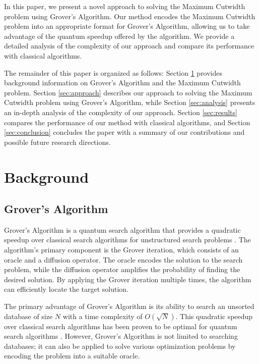 In this paper, we present a novel approach to solving the Maximum Cutwidth problem using Grover's Algorithm. Our method encodes the Maximum Cutwidth problem into an appropriate format for Grover's Algorithm, allowing us to take advantage of the quantum speedup offered by the algorithm. We provide a detailed analysis of the complexity of our approach and compare its performance with classical algorithms.

The remainder of this paper is organized as follows: Section \ref{sec:background} provides background information on Grover's Algorithm and the Maximum Cutwidth problem. Section \ref{sec:approach} describes our approach to solving the Maximum Cutwidth problem using Grover's Algorithm, while Section \ref{sec:analysis} presents an in-depth analysis of the complexity of our approach. Section \ref{sec:results} compares the performance of our method with classical algorithms, and Section \ref{sec:conclusion} concludes the paper with a summary of our contributions and possible future research directions.

\section{Background}
\label{sec:background}

\subsection{Grover's Algorithm}
\label{subsec:grover}

Grover's Algorithm is a quantum search algorithm that provides a quadratic speedup over classical search algorithms for unstructured search problems \cite{grover1996fast}. The algorithm's primary component is the Grover iteration, which consists of an oracle and a diffusion operator. The oracle encodes the solution to the search problem, while the diffusion operator amplifies the probability of finding the desired solution. By applying the Grover iteration multiple times, the algorithm can efficiently locate the target solution.

The primary advantage of Grover's Algorithm is its ability to search an unsorted database of size $N$ with a time complexity of $O(\sqrt{N})$. This quadratic speedup over classical search algorithms has been proven to be optimal for quantum search algorithms \cite{bennett1997strengths}. However, Grover's Algorithm is not limited to searching databases; it can also be applied to solve various optimization problems by encoding the problem into a suitable oracle.

